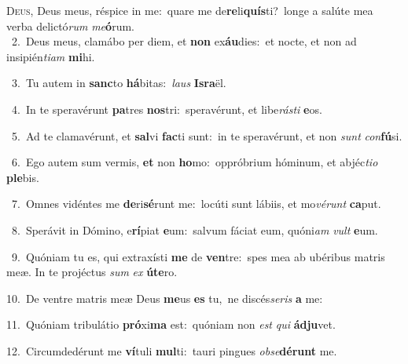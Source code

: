 \lettrine{\initial\textcolor{\initialcolor}{D}}{eus,} Deus meus, réspice in me:~\dagger quare me de\-\textbf{re}\-li\-\textbf{quís}\-ti?~\star longe a salúte mea verba delictó\textit{rum} \textit{me}\-\textbf{ó}rum.\\
{\numbfont\textcolor{\numbcolor}{~2.}}~Deus meus, clamábo per diem, et \textbf{non} ex\-\textbf{áu}\-dies:~\star et nocte, et non ad insipién\-\textit{ti}\-\textit{am} \textbf{mi}\-hi.\par
{\numbfont\textcolor{\numbcolor}{~3.}}~Tu autem in \textbf{sanc}\-to \textbf{há}\-bitas:~\star \textit{laus} \textbf{Is}\-\textbf{ra}ël.\par
{\numbfont\textcolor{\numbcolor}{~4.}}~In te speravérunt \textbf{pa}\-tres \textbf{nos}\-tri:~\star speravérunt, et libe\-\textit{rás}\-\textit{ti} \textbf{e}\-os.\par
{\numbfont\textcolor{\numbcolor}{~5.}}~Ad te clamavérunt, et \textbf{sal}\-vi \textbf{fac}\-ti sunt:~\star in te speravérunt, et non \textit{sunt} \textit{con}\-\textbf{fú}si.\par
{\numbfont\textcolor{\numbcolor}{~6.}}~Ego autem sum vermis, \textbf{et} non \textbf{ho}\-mo:~\star oppróbrium hóminum, et abjéc\-\textit{ti}\-\textit{o} \textbf{ple}\-bis.\par
{\numbfont\textcolor{\numbcolor}{~7.}}~Omnes vidéntes me \textbf{de}\-ri\-\textbf{sé}\-runt me:~\star locúti sunt lábiis, et mo\-\textit{vé}\-\textit{runt} \textbf{ca}\-put.\par
{\numbfont\textcolor{\numbcolor}{~8.}}~Sperávit in Dómino, e\-\textbf{rí}\-piat \textbf{e}\-um:~\star salvum fáciat eum, quóni\textit{am} \textit{vult} \textbf{e}\-um.\par
{\numbfont\textcolor{\numbcolor}{~9.}}~Quóniam tu es, qui extraxísti \textbf{me} de \textbf{ven}\-tre:~\star spes mea ab ubéribus matris meæ. In te projéctus \textit{sum} \textit{ex} \textbf{ú}\-\textbf{te}ro.\par
{\numbfont\textcolor{\numbcolor}{10.}}~De ventre matris meæ Deus \textbf{me}\-us \textbf{es} tu,~\star ne discés\-\textit{se}\-\textit{ris} \textbf{a} me:\par
{\numbfont\textcolor{\numbcolor}{11.}}~Quóniam tribulátio \textbf{pró}\-xi\textbf{ma} est:~\star quóniam non \textit{est} \textit{qui} \textbf{ád}\-\textbf{ju}vet.\par
{\numbfont\textcolor{\numbcolor}{12.}}~Circumdedérunt me \textbf{ví}\-tuli \textbf{mul}\-ti:~\star tauri pingues \textit{ob}\-\textit{se}\textbf{dé}\textbf{runt} me.\par
